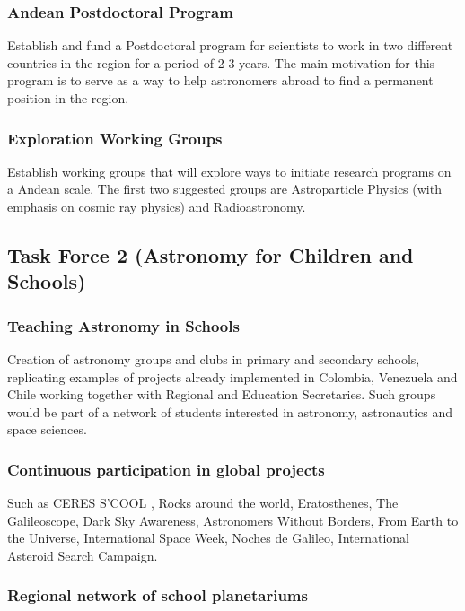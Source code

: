 \documentclass[12pt]{article}
\begin{document}
\subsubsection*{Andean Postdoctoral Program}
Establish and fund a Postdoctoral program for scientists to work in
two different countries in the region for a period of 2-3 years. The
main motivation for this program is to serve as a way to help
astronomers abroad to find a permanent position in the region. 

\subsubsection*{Exploration Working Groups}
Establish working groups that will explore ways to initiate research
programs on a Andean scale. The first two suggested groups are
Astroparticle Physics (with emphasis on cosmic ray physics) and
Radioastronomy. 

\subsection{Task Force 2 (Astronomy for Children and Schools)}


\subsubsection*{Teaching Astronomy in Schools}
Creation of astronomy groups and clubs  in primary  and secondary
schools, replicating examples of projects already implemented in
Colombia, Venezuela and Chile  working together with Regional and
Education Secretaries. Such groups would be part of a network of
students  interested in astronomy, astronautics and space sciences.  

\subsubsection*{Continuous participation in  global projects} 

Such as  CERES S'COOL , Rocks around the world,  Eratosthenes, The
Galileoscope,  Dark Sky Awareness, Astronomers Without Borders, From
Earth to the Universe, International Space Week,   Noches de Galileo,
International Asteroid Search Campaign. 

\subsubsection*{Regional network of school planetariums} 
\end{document}

